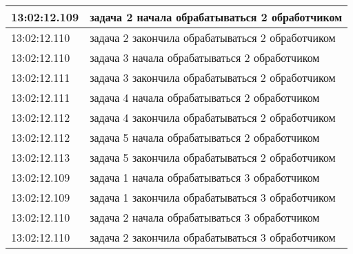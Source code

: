 \begin{table}[h]
\begin{center}
\begin{threeparttable}
\begin{tabular}{|l|l|}
                         13:02:12.109  & задача 2 начала обрабатываться 2 обработчиком \\
                                                 \hline

                         13:02:12.110  & задача 2 закончила обрабатываться 2 обработчиком \\
                                                 \hline

                         13:02:12.110  & задача 3 начала обрабатываться 2 обработчиком \\
                                                 \hline

                         13:02:12.111  & задача 3 закончила обрабатываться 2 обработчиком \\
                                                 \hline

                         13:02:12.111  & задача 4 начала обрабатываться 2 обработчиком \\
                                                 \hline

                         13:02:12.112  & задача 4 закончила обрабатываться 2 обработчиком \\
                                                 \hline

                         13:02:12.112  & задача 5 начала обрабатываться 2 обработчиком \\
                                                 \hline

                         13:02:12.113  & задача 5 закончила обрабатываться 2 обработчиком \\
                                                 \hline

                         13:02:12.109  & задача 1 начала обрабатываться 3 обработчиком \\
                                                 \hline

                         13:02:12.109  & задача 1 закончила обрабатываться 3 обработчиком \\
                                                 \hline

                         13:02:12.110  & задача 2 начала обрабатываться 3 обработчиком \\
                                                 \hline

                         13:02:12.110  & задача 2 закончила обрабатываться 3 обработчиком \\
                                                 \hline


\end{tabular}
\end{threeparttable}
\end{center}
\end{table}
